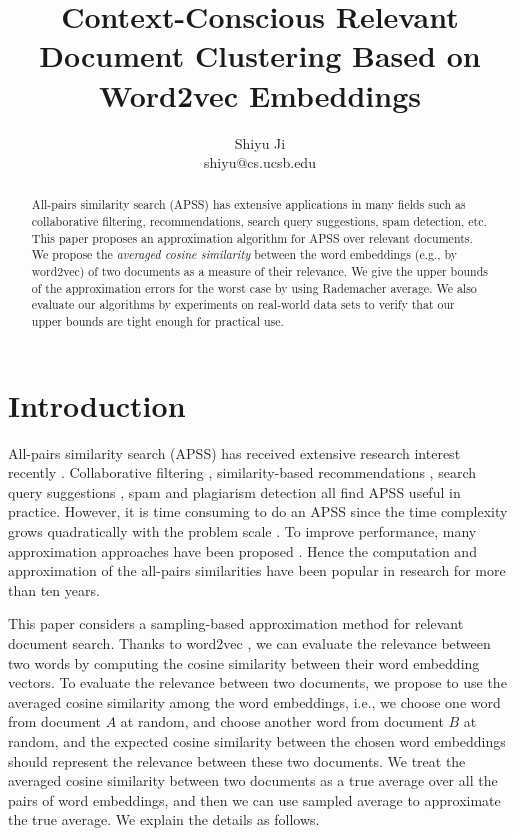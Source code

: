 \documentclass{article}
\begin{document}
\title{\Large\bf Context-Conscious Relevant Document Clustering Based on Word2vec Embeddings}
\author{Shiyu Ji\\ shiyu@cs.ucsb.edu}
\date{}
\maketitle

\newtheorem{definition}{Definition}
\theoremstyle{definition}
\newtheorem{theorem}{Theorem}
\theoremstyle{plain}
\newtheorem{lemma}{Lemma}
\theoremstyle{plain}
\newtheorem{corollary}{Corollary}
\theoremstyle{plain}

\begin{abstract}
All-pairs similarity search (APSS) has extensive applications in many fields such as collaborative filtering, recommendations, search query suggestions, spam detection, etc.
This paper proposes an approximation algorithm for APSS over relevant documents. We propose the \emph{averaged cosine similarity} between the word embeddings (e.g., by word2vec) of two documents as a measure of their relevance.
We give the upper bounds of the approximation errors for the worst case by using Rademacher average.
We also evaluate our algorithms by experiments on real-world data sets to verify that our upper bounds are tight enough for practical use.
\end{abstract}

\section{Introduction}
All-pairs similarity search (APSS) has received extensive research interest recently \cite{BMS07,Xia16,ATY13,TAJY14}. Collaborative filtering \cite{SKK01}, similarity-based recommendations \cite{RV97}, search query suggestions \cite{CJP08}, spam and plagiarism detection \cite{CDG07,LCH06} all find APSS useful in practice. However, it is time consuming to do an APSS since the time complexity grows quadratically with the problem scale \cite{BMS07,ATY13,TAJY14}. To improve performance, many approximation approaches have been proposed \cite{GIM99,FKS03,IM98,Char02,LRU14}. Hence the computation \cite{BMS07,DHM04,Xia16,ATY13,TAJY14} and approximation \cite{LRU14,GIM99,FKS03,IM98,Char02} of the all-pairs similarities have been popular in research for more than ten years.

This paper considers a sampling-based approximation method for relevant document search. Thanks to word2vec \cite{MSC13,MCC13}, we can evaluate the relevance between two words by computing the cosine similarity between their word embedding vectors. To evaluate the relevance between two documents, we propose to use the averaged cosine similarity among the word embeddings, i.e., we choose one word from document $A$ at random, and choose another word from document $B$ at random, and the expected cosine similarity between the chosen word embeddings should represent the relevance between these two documents. We treat the averaged cosine similarity between two documents as a true average over all the pairs of word embeddings, and then we can use sampled average to approximate the true average. We explain the details as follows.
\end{document}
